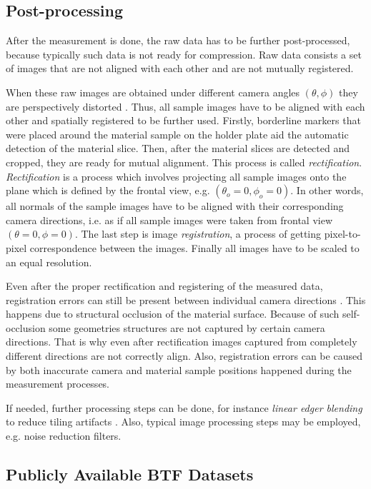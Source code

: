 \subsection{Post-processing}
\label{section:Post_processing_acquisition}	
After the measurement is done, the raw data has to be further post-processed, because typically such  data is not ready for compression.
Raw data consists a set of images that are not aligned with each other and are not mutually registered.

When these raw images are obtained under different camera angles $(\theta,\phi)$ they are perspectively distorted \cite{sattler-2003-efficient}.
Thus, all sample images have to be aligned with each other and spatially registered to be further used.
Firstly, borderline markers that were placed around the material sample on the holder plate aid the automatic detection of the material slice.
Then, after the material slices are detected and cropped, they are ready for mutual alignment. This process is called  \emph{rectification}. 
\emph{Rectification} is a process which involves projecting all sample images onto the plane which is defined by the frontal view, e.g. $(\theta _{o} =0,\phi _{o}=0)$.
In other words, all normals of the sample images have to be aligned with their corresponding camera directions, i.e. as if all sample images were taken from frontal view $(\theta =0,\phi=0)$.
The last step is image \emph{registration}, a process of getting pixel-to-pixel correspondence between the images.
Finally all images have to be scaled to an equal resolution.


Even after the proper rectification and registering of the measured data, registration errors can still be present between individual camera directions \cite{haindl_visual}. 
 This happens due to structural occlusion of the material surface. Because of such self-occlusion some geometries structures are not captured by certain camera directions.
 That is why even after rectification images captured from completely different directions are not correctly align. 
Also, registration errors can be caused by both inaccurate camera and material sample positions happened during the measurement processes.


If needed, further processing steps can be done, for instance \emph{linear edger blending} to reduce tiling artifacts \cite{sattler-2003-efficient}.
Also, typical image processing steps may be employed, e.g. noise reduction filters. 


\subsection{Publicly Available BTF Datasets}
\label{section:Publicly_datasets}	

